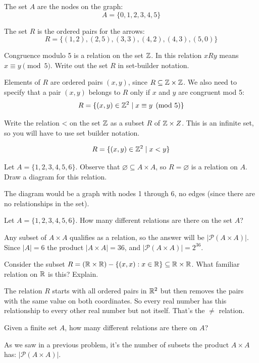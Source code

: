 \documentclass{article}
\begin{document}
The set $A$ are the nodes on the graph:
$$A = \{0, 1, 2, 3, 4, 5\}$$

The set $R$ is the ordered pairs for the arrows:
$$R = \{(1, 2), (2, 5), (3, 3), (4, 2), (4, 3), (5, 0)\}$$

\begin{problem}
Congruence modulo 5 is a relation on the set $\mathbb{Z}$. In this relation $xRy$ means $x \equiv y \pmod{5}$. Write out the set $R$ in set-builder notation.
\end{problem}

Elements of $R$ are ordered pairs $(x, y)$, since $R \subseteq \mathbb{Z} \times \mathbb{Z}$. We also need to specify that a pair $(x, y)$ belongs to $R$ only if $x$ and $y$ are congruent mod 5:
$$R = \{(x,y) \in \mathbb{Z}^2 \mid x \equiv y \pmod{5}\}$$

\begin{problem}
Write the relation < on the set $\mathbb{Z}$ as a subset $R$ of $\mathbb{Z} \times Z$. This is an infinite set, so you will have to use set builder notation.
\end{problem}

$$R = \{(x, y) \in \mathbb{Z}^2 \mid x < y\}$$

\begin{problem}
Let $A = \{1, 2, 3, 4, 5, 6\}$. Observe that $\varnothing \subseteq A \times A$, so $R = \varnothing$ is a relation on $A$. Draw a diagram for this relation.
\end{problem}

The diagram would be a graph with nodes 1 through 6, no edges (since there are no relationships in the set).

\begin{problem}
Let $A = \{1, 2, 3, 4, 5, 6\}$. How many different relations are there on the set $A$?
\end{problem}

Any subset of $A \times A$ qualifies as a relation, so the answer will be $|\mathcal{P}(A \times A)|$. Since $|A| = 6$ the product $|A \times A| = 36$, and $|\mathcal{P}(A \times A)| = 2^{36}$.

\begin{problem}
Consider the subset $R = (\mathbb{R} \times \mathbb{R}) - \{(x, x) : x \in \mathbb{R}\} \subseteq \mathbb{R} \times \mathbb{R}$. What familiar relation on $\mathbb{R}$ is this? Explain.
\end{problem}

The relation $R$ starts with all ordered pairs in $\mathbb{R}^2$ but then removes the pairs with the same value on both coordinates. So every real number has this relationship to every other real number but not itself. That's the $\neq$ relation.

\begin{problem}
Given a finite set $A$, how many different relations are there on $A$?
\end{problem}

As we saw in a previous problem, it's the number of subsets the product $A \times A$ has: $|\mathcal{P}(A \times A)|$.
\end{document}
